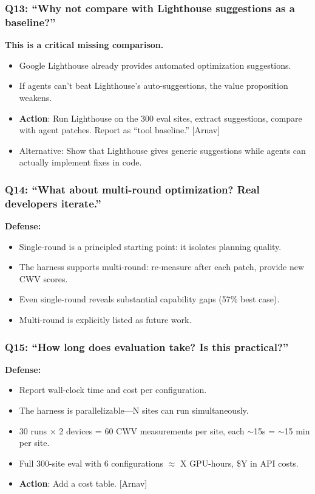 \subsubsection{Q13: ``Why not compare with Lighthouse suggestions as a baseline?''}
\textbf{This is a critical missing comparison.}
\begin{itemize}
    \item Google Lighthouse already provides automated optimization suggestions.
    \item If agents can't beat Lighthouse's auto-suggestions, the value proposition weakens.
    \item \textbf{Action}: Run Lighthouse on the 300 eval sites, extract suggestions, compare with agent patches. Report as ``tool baseline.'' [Arnav]
    \item Alternative: Show that Lighthouse gives generic suggestions while agents can actually implement fixes in code.
\end{itemize}

\subsubsection{Q14: ``What about multi-round optimization? Real developers iterate.''}
\textbf{Defense:}
\begin{itemize}
    \item Single-round is a principled starting point: it isolates planning quality.
    \item The harness supports multi-round: re-measure after each patch, provide new CWV scores.
    \item Even single-round reveals substantial capability gaps (57\% best case).
    \item Multi-round is explicitly listed as future work.
\end{itemize}

\subsubsection{Q15: ``How long does evaluation take? Is this practical?''}
\textbf{Defense:}
\begin{itemize}
    \item Report wall-clock time and cost per configuration.
    \item The harness is parallelizable---N sites can run simultaneously.
    \item 30 runs $\times$ 2 devices = 60 CWV measurements per site, each $\sim$15s = $\sim$15 min per site.
    \item Full 300-site eval with 6 configurations $\approx$ X GPU-hours, \$Y in API costs.
    \item \textbf{Action}: Add a cost table. [Arnav]
\end{itemize}

